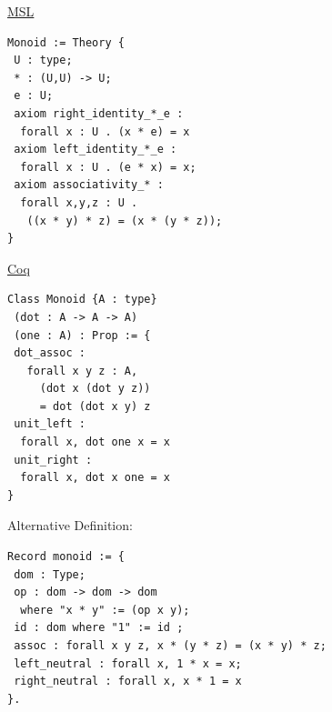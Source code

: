 \documentclass{beamer}
\begin{document}
\begin{frame}[fragile,t]
\begin{multicols}{3} 
     \begin{minipage}{2.3in}
\underline{MSL}
\begin{lstlisting}
Monoid := Theory {
 U : type; 
 * : (U,U) -> U; 
 e : U; 
 axiom right_identity_*_e : 
  forall x : U . (x * e) = x 
 axiom left_identity_*_e : 
  forall x : U . (e * x) = x;
 axiom associativity_* : 
  forall x,y,z : U . 
   ((x * y) * z) = (x * (y * z));
}
\end{lstlisting}
\underline{Coq}
\begin{lstlisting}
Class Monoid {A : type} 
 (dot : A -> A -> A)
 (one : A) : Prop := {
 dot_assoc : 
   forall x y z : A, 
     (dot x (dot y z)) 
     = dot (dot x y) z
 unit_left : 
  forall x, dot one x = x 
 unit_right : 
  forall x, dot x one = x 
}      
\end{lstlisting}
Alternative Definition: 
\begin{lstlisting}
Record monoid := { 
 dom : Type; 
 op : dom -> dom -> dom 
  where "x * y" := (op x y); 
 id : dom where "1" := id ;  
 assoc : forall x y z, x * (y * z) = (x * y) * z; 
 left_neutral : forall x, 1 * x = x; 
 right_neutral : forall x, x * 1 = x
}.
\end{lstlisting}
 \end{minipage}
  

\end{multicols}
\end{frame}
\end{document}
